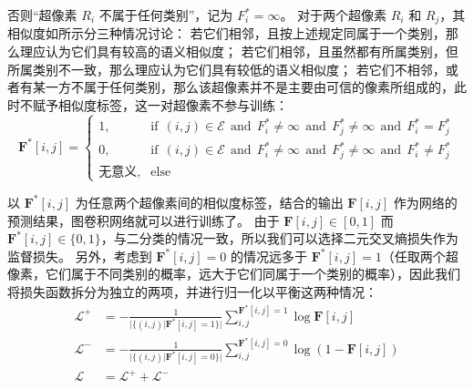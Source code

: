 否则“超像素 $R_i$ 不属于任何类别”，记为 $F^{*}_i = \infty$。
对于两个超像素 $R_i$ 和 $R_j$，其相似度如所示分三种情况讨论：
若它们相邻，且按上述规定同属于一个类别，那么理应认为它们具有较高的语义相似度；
若它们相邻，且虽然都有所属类别，但所属类别不一致，那么理应认为它们具有较低的语义相似度；
若它们不相邻，或者有某一方不属于任何类别，那么该超像素并不是主要由可信的像素所组成的，此时不赋予相似度标签，这一对超像素不参与训练：
\begin{equation}
\mathbf{F}^{*}[i,j] =
\begin{cases}
1,&\text{if}\ \ (i,j) \in \mathcal{E}\ \ \text{and}\ \ F^{*}_i \neq \infty\ \ \text{and}\ \ F^{*}_j \neq \infty\ \ \text{and}\ \ F^{*}_i = F^{*}_j\\
0,&\text{if}\ \ (i,j) \in \mathcal{E}\ \ \text{and}\ \ F^{*}_i \neq \infty\ \ \text{and}\ \ F^{*}_j \neq \infty\ \ \text{and}\ \ F^{*}_i \neq F^{*}_j\\
\text{无意义},&\text{else}
\end{cases}
\end{equation}
\par
以 $\mathbf{F}^{*}[i,j]$ 为任意两个超像素间的相似度标签，结合的输出 $\mathbf{F}[i,j]$ 作为网络的预测结果，图卷积网络就可以进行训练了。
由于 $\mathbf{F}[i,j] \in [0,1]$ 而 $\mathbf{F}^{*}[i,j] \in \{0,1\}$，与二分类的情况一致，所以我们可以选择二元交叉熵损失作为监督损失。
另外，考虑到 $\mathbf{F}^{*}[i,j] = 0$ 的情况远多于 $\mathbf{F}^{*}[i,j] = 1$（任取两个超像素，它们属于不同类别的概率，远大于它们同属于一个类别的概率），因此我们将损失函数拆分为独立的两项，并进行归一化以平衡这两种情况：
\begin{align}
\mathcal{L}^{+} &= -\frac{1}{\vert \{ (i,j) \vert \mathbf{F}^{*}[i,j] = 1 \} \vert} \sum_{i,j}^{\mathbf{F}^{*}[i,j] = 1} \log \mathbf{F}[i,j]\\
\mathcal{L}^{-} &= -\frac{1}{\vert \{ (i,j) \vert \mathbf{F}^{*}[i,j] = 0 \} \vert} \sum_{i,j}^{\mathbf{F}^{*}[i,j] = 0} \log (1 - \mathbf{F}[i,j])\\
\mathcal{L} &= \mathcal{L}^{+} + \mathcal{L}^{-}
\end{align}
